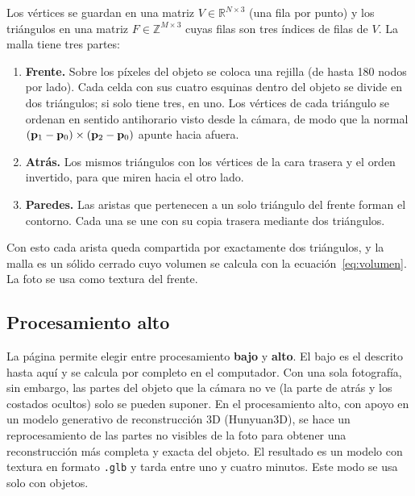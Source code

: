 Los vértices se guardan en una matriz $V\in\mathbb{R}^{N\times3}$ (una fila por
punto) y los triángulos en una matriz $F\in\mathbb{Z}^{M\times3}$ cuyas filas
son tres índices de filas de $V$. La malla tiene tres partes:
\begin{enumerate}
  \item \textbf{Frente.} Sobre los píxeles del objeto se coloca una rejilla (de
        hasta 180 nodos por lado). Cada celda con sus cuatro esquinas dentro
        del objeto se divide en dos triángulos; si solo tiene tres, en uno.
        Los vértices de cada triángulo se ordenan en sentido antihorario visto
        desde la cámara, de modo que la normal
        $(\mathbf{p}_1-\mathbf{p}_0)\times(\mathbf{p}_2-\mathbf{p}_0)$ apunte hacia
        afuera.
  \item \textbf{Atrás.} Los mismos triángulos con los vértices de la cara
        trasera y el orden invertido, para que miren hacia el otro lado.
  \item \textbf{Paredes.} Las aristas que pertenecen a un solo triángulo del
        frente forman el contorno. Cada una se une con su copia trasera
        mediante dos triángulos.
\end{enumerate}
Con esto cada arista queda compartida por exactamente dos triángulos, y la
malla es un sólido cerrado cuyo volumen se calcula con la
ecuación~\eqref{eq:volumen}. La foto se usa como textura del frente.





\subsection{Procesamiento alto}

La página permite elegir entre procesamiento \textbf{bajo} y \textbf{alto}. El
bajo es el descrito hasta aquí y se calcula por completo en el computador. Con
una sola fotografía, sin embargo, las partes del objeto que la cámara no ve (la
parte de atrás y los costados ocultos) solo se pueden suponer. En el
procesamiento alto, con apoyo en un modelo generativo de reconstrucción 3D
(Hunyuan3D), se hace un reprocesamiento de las partes no visibles de la foto
para obtener una reconstrucción más completa y exacta del objeto. El resultado
es un modelo con textura en formato \texttt{.glb} y tarda entre uno y cuatro
minutos. Este modo se usa solo con objetos.



